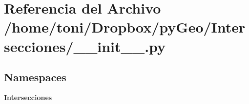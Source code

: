 \section{Referencia del Archivo /home/toni/\-Dropbox/py\-Geo/\-Intersecciones/\-\_\-\-\_\-init\-\_\-\-\_\-.py}
\label{Intersecciones_2____init_____8py}
\subsection*{Namespaces}
\begin{DoxyCompactItemize}
\item 
{\bf Intersecciones}
\end{DoxyCompactItemize}
